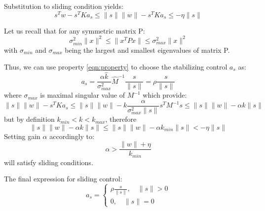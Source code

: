     Substitution to sliding condition yields:
    \begin{equation}
    s^Tw- s^TKa_s  \leq \|s\|\|w\| - s^TKa_s  \leq - \eta \|s\|
    \label{eqn::sliding_condition}
    \end{equation}

    Let us recall that for any symmetric matrix P:
    \begin{equation}
        \label{eqn:property}
        \sigma^2_{min} \|x\|^2 \leq \|x^TPx\| \leq \sigma^2_{max} \|x\|^2
    \end{equation}
    with $\sigma_{min}$ and $\sigma_{max}$ being the largest and smallest 
    eigenvalues of matrix P.

    Thus, we can use property \ref*{eqn:property} to choose the stabilizing control $a_s$ as:
    \begin{equation}
        a_s = \frac{\alpha \hat{k}}{\sigma_{max}^2}\hat{M}^{-1}\frac{s}{\|s\|} = 
        \rho \frac{s}{\|s\|} 
    \end{equation}
    where $\sigma_{max}$ is maximal singular value of $M^{-1}$
    which provide:
    \begin{equation}
        \|s\|\|w\| - s^TKa_s \leq 
        \|s\|\|w\| - k \frac{\alpha}{\sigma^2_{max}\|s\|}s^TM^{-1}s \leq 
        \|s\|\|w\| - \alpha k \|s\|
    \end{equation}
    but by definition $k_{min} < k < k_{max}$, therefore
    \begin{equation}
        \|s\|\|w\| - \alpha k \|s\| \leq
        \|s\|\|w\| - \alpha k_{min} \|s\| < - \eta \|s\|
    \end{equation}
    Setting gain $\alpha$ accordingly to:
    \begin{equation}
    \alpha > \frac{\|w\| + \eta}{k_{min}}
    \end{equation}
    will satisfy sliding conditions.

    The final expression for sliding control:
    \begin{equation}   
    a_s = 
    \begin{cases}
    \rho \frac{s}{\|s\|}, \quad \|s\| > 0\\
    0, \quad \|s\| = 0 
    \end{cases}
    \end{equation}

